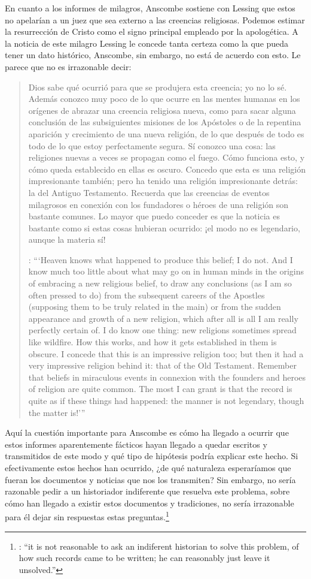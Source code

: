 En cuanto a los informes de milagros, Anscombe sostiene con Lessing que estos no apelarían a un juez que sea externo a las creencias religiosas. Podemos estimar la resurrección de Cristo como el signo principal empleado por la apologética. A la noticia de este milagro Lessing le concede tanta certeza como la que pueda tener un dato histórico, Anscombe, sin embargo, no está de acuerdo con esto. Le parece que no es irrazonable decir: \blockquote[{\cite[26]{anscombe2008faith:prophandmi}}: \enquote{`Heaven knows what happened to produce this belief; I do not. And I know much too little about what may go on in human minds in the origins of embracing a new religious belief, to draw any conclusions (as I am so often pressed to do) from the subsequent careers of the Apostles (supposing them to be truly related in the main) or from the sudden appearance and growth of a new religion, which after all is all I am really perfectly certain of. I do know one thing: new religions sometimes spread like wildfire. How this works, and how it gets established in them is obscure. I concede that this is an impressive religion too; but then it had a very impressive religion behind it: that of the Old Testament. Remember that beliefs in miraculous events in connexion with the founders and heroes of religion are quite common. The most I can grant is that the record is quite as if these things had happened: the manner is not legendary, though the matter is!'}]{Dios sabe qué ocurrió para que se produjera esta creencia; yo no lo sé. Además conozco muy poco de lo que ocurre en las mentes humanas en los orígenes de abrazar una creencia religiosa nueva, como para sacar alguna conclusión \textelp{} de las subsiguientes misiones de los Apóstoles \textelp{} o de la repentina aparición y crecimiento de una nueva religión, de lo que después de todo es todo de lo que estoy perfectamente segura. Sí conozco una cosa: las religiones nuevas a veces se propagan como el fuego. Cómo funciona esto, y cómo queda establecido en ellas es oscuro. Concedo que esta es una religión impresionante también; pero ha tenido una religión impresionante detrás: la del Antiguo Testamento. Recuerda que las creencias de eventos milagrosos en conexión con los fundadores o héroes de una religión son bastante comunes. Lo mayor que puedo conceder es que la noticia es bastante como si estas cosas hubieran ocurrido: ¡el modo no es legendario, aunque la materia sí!}

Aquí la cuestión importante para Anscombe es cómo ha llegado a ocurrir que estos informes aparentemente fácticos hayan llegado a quedar escritos y transmitidos de este modo y qué tipo de hipótesis podría explicar este hecho. Si efectivamente estos hechos han ocurrido, ¿de qué naturaleza esperaríamos que fueran los documentos y noticias que nos los transmiten? Sin embargo, no sería razonable pedir a un historiador indiferente que resuelva este problema, sobre cómo han llegado a existir estos documentos y tradiciones, no sería irrazonable para él dejar sin respuestas estas preguntas.\footnote{\cite[Cf.~][37]{anscombe2008faith:prophandmi}: \enquote{it is not reasonable to ask an indiferent historian to solve this problem, of how such records came to be written; he can reasonably just leave it unsolved.}}

